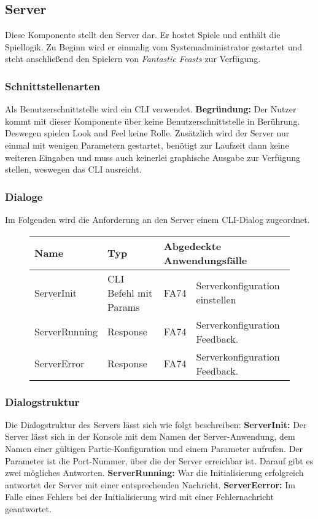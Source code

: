 \subsection{Server}
Diese Komponente stellt den Server dar. Er hostet Spiele und enthält die Spiellogik. Zu Beginn wird er einmalig vom Systemadministrator gestartet und steht anschließend den Spielern von \textit{Fantastic Feasts} zur Verfügung.

\subsubsection{Schnittstellenarten}
Als Benutzerschnittstelle wird ein CLI verwendet. \textbf{Begründung:} Der Nutzer kommt mit dieser Komponente über keine Benutzerschnittstelle in Berührung. Deswegen spielen Look and Feel keine Rolle. Zusätzlich wird der Server nur einmal mit wenigen Parametern gestartet, benötigt zur Laufzeit dann keine weiteren Eingaben und muss auch keinerlei graphische Ausgabe zur Verfügung stellen, weswegen das CLI ausreicht.

\subsubsection{Dialoge}
Im Folgenden wird die Anforderung an den Server einem CLI-Dialog zugeordnet.

\begin{figure}[H]
    \centering
    \begin{tabular}{| l l l l |}
    \hline
    \textbf{Name} & \textbf{Typ} & \multicolumn{2}{l|}{\textbf{Abgedeckte Anwendungsfälle}} \\\hline
    ServerInit & CLI Befehl mit Params & FA74 & Serverkonfiguration einstellen \\\hline
    ServerRunning & Response & FA74 & Serverkonfiguration Feedback.\\\hline
    ServerError & Response & FA74 & Serverkonfiguration Feedback.\\\hline
    
    \end{tabular}
\end{figure}

\subsubsection{Dialogstruktur}  
Die Dialogstruktur des Servers lässt sich wie folgt beschreiben: \textbf{ServerInit:} Der Server lässt sich in der Konsole mit dem Namen der Server-Anwendung, dem Namen einer gültigen Partie-Konfiguration und einem Parameter aufrufen. Der Parameter ist die Port-Nummer, über die der Server erreichbar ist. Darauf gibt es zwei mögliches Antworten. \textbf{ServerRunning:} War die Initialisierung erfolgreich antwortet der Server mit einer entsprechenden Nachricht. \textbf{ServerEerror:} Im Falle eines Fehlers bei der Initialisierung wird mit einer Fehlernachricht geantwortet.
